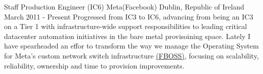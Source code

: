 

\begin{cventries}

  \cventry
  {Staff Production Engineer (IC6)} %
  {Meta(Facebook)} %
  {Dublin, Republic of Ireland} %
  {March 2011 - Present} %
  {
    Progressed from IC3 to IC6, advancing from being an IC3 on a Tier 1 with infrastructure-wide support responsibilities to
    leading critical datacenter automation initiatives in the bare metal provisoining space.
    Lately I have spearheaded an effor to transform the way
    we manage the Operating System for Meta's custom network switch infrastructure
    \href{https://engineering.fb.com/2015/03/10/data-center-engineering/facebook-open-switching-system-fboss-and-wedge-in-the-open/}{(FBOSS)},
    focusing on scalability, reliability, ownership and time to provision improvements.
  }
  \vspace{5mm}


\end{cventries}
